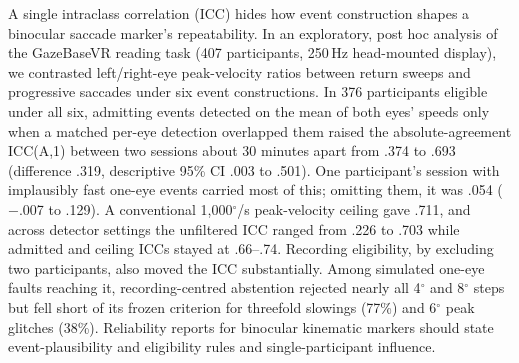 A single intraclass correlation (ICC) hides how event construction shapes a binocular saccade marker's repeatability. In an exploratory, post hoc analysis of the GazeBaseVR reading task (407 participants, 250\,Hz head-mounted display), we contrasted left/right-eye peak-velocity ratios between return sweeps and progressive saccades under six event constructions. In 376 participants eligible under all six, admitting events detected on the mean of both eyes' speeds only when a matched per-eye detection overlapped them raised the absolute-agreement ICC(A,1) between two sessions about 30 minutes apart from .374 to .693 (difference .319, descriptive 95\% CI .003 to .501). One participant's session with implausibly fast one-eye events carried most of this; omitting them, it was .054 ($-$.007 to .129). A conventional 1,000$^\circ$/s peak-velocity ceiling gave .711, and across detector settings the unfiltered ICC ranged from .226 to .703 while admitted and ceiling ICCs stayed at .66--.74. Recording eligibility, by excluding two participants, also moved the ICC substantially. Among simulated one-eye faults reaching it, recording-centred abstention rejected nearly all 4$^\circ$ and 8$^\circ$ steps but fell short of its frozen criterion for threefold slowings (77\%) and 6$^\circ$ peak glitches (38\%). Reliability reports for binocular kinematic markers should state event-plausibility and eligibility rules and single-participant influence.
